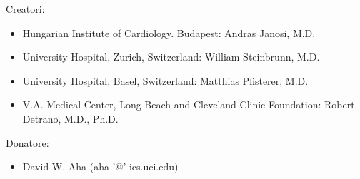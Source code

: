 \documentclass[a4paper]{article}
\begin{document}
    Creatori:
    \begin{itemize}
        \item Hungarian Institute of Cardiology. Budapest: Andras Janosi, M.D. 
        \item University Hospital, Zurich, Switzerland: William Steinbrunn, M.D.
        \item University Hospital, Basel, Switzerland: Matthias Pfisterer, M.D. 
        \item V.A. Medical Center, Long Beach and Cleveland Clinic Foundation: Robert Detrano, M.D., Ph.D.
    \end{itemize}
    Donatore:
    \begin{itemize}
        \item David W. Aha (aha '@' ics.uci.edu)
    \end{itemize}
\end{document}
